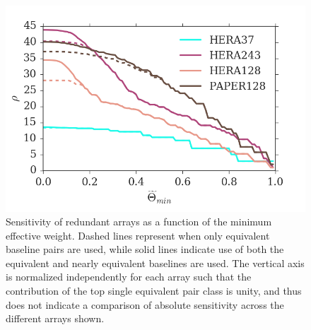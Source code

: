 \documentclass[twocolumn,apj,numberedappendix]{emulateapj}
\renewcommand\[{\begin{equation}}
\renewcommand\]{\end{equation}}
\begin{document}
\begin{figure}[H]
\includegraphics[width=\linewidth]{osens}
\caption{Sensitivity of redundant arrays as a function of the minimum effective weight. Dashed lines represent when only equivalent baseline pairs are used, while solid lines indicate use of both the equivalent and nearly equivalent baselines are used. The vertical axis is normalized independently for each array such that the contribution of the top single equivalent pair class is unity, and thus does not indicate a comparison of absolute sensitivity across the different arrays shown.  }
\label{fig:osens}
\end{figure}











\end{document}
